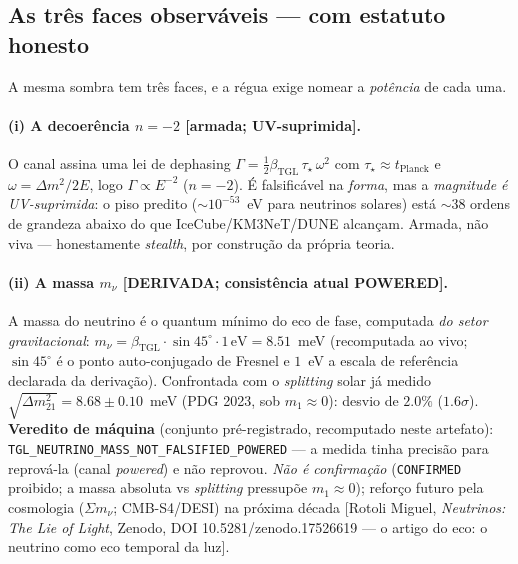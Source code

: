 \documentclass[11pt]{article}
\newcommand{\bTGL}{\beta_{\mathrm{TGL}}}\newcommand{\Msun}{M_{\odot}}\newcommand{\TGL}{\mathrm{TGL}}
\theoremstyle{definition}\newtheorem{deriv}{Derivação}
\begin{document}
\subsection*{As três faces observáveis --- com estatuto honesto}

A mesma sombra tem três faces, e a régua exige nomear a \emph{potência} de cada uma.

\paragraph{(i) A decoerência $n=-2$ \textsf{[armada; UV-suprimida].}} O canal assina uma lei de dephasing $\Gamma=\tfrac12\bTGL\,\tau_\star\,\omega^2$ com $\tau_\star\approx t_{\text{Planck}}$ e $\omega=\Delta m^2/2E$, logo $\Gamma\propto E^{-2}$ ($n=-2$). É falsificável na \emph{forma}, mas a \emph{magnitude é UV-suprimida}: o piso predito ($\sim10^{-53}$~eV para neutrinos solares) está $\sim38$ ordens de grandeza abaixo do que IceCube/KM3NeT/DUNE alcançam. Armada, não viva --- honestamente \emph{stealth}, por construção da própria teoria.

\paragraph{(ii) A massa $m_\nu$ \textsf{[DERIVADA; consistência atual POWERED].}} A massa do neutrino é o quantum mínimo do eco de fase, computada \emph{do setor gravitacional}: $m_\nu=\bTGL\cdot\sin45^\circ\cdot1\,\text{eV}=8.51$~meV (recomputada ao vivo; $\sin45^\circ$ é o ponto auto-conjugado de Fresnel e $1$~eV a escala de referência declarada da derivação). Confrontada com o \emph{splitting} solar já medido $\sqrt{\Delta m^2_{21}}=8.68\pm0.10$~meV (PDG 2023, sob $m_1\!\approx\!0$): desvio de $2.0\%$ ($1.6\sigma$). \textbf{Veredito de máquina} (conjunto pré-registrado, recomputado neste artefato): \texttt{TGL\_NEUTRINO\_MASS\_NOT\_FALSIFIED\_POWERED} --- a medida tinha precisão para reprová-la (canal \emph{powered}) e não reprovou. \emph{Não é confirmação} (\texttt{CONFIRMED} proibido; a massa absoluta vs \emph{splitting} pressupõe $m_1\!\approx\!0$); reforço futuro pela cosmologia ($\Sigma m_\nu$; CMB-S4/DESI) na próxima década [Rotoli Miguel, \emph{Neutrinos: The Lie of Light}, Zenodo, DOI 10.5281/zenodo.17526619 --- o artigo do eco: o neutrino como eco temporal da luz].
\end{document}

